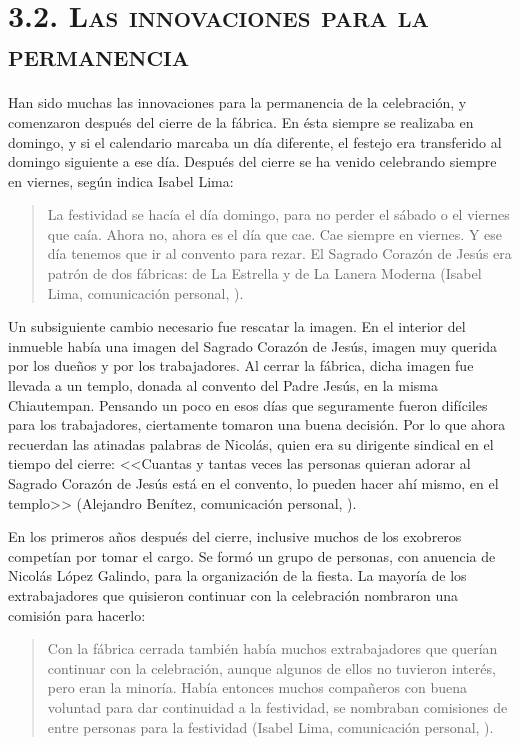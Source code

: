 \documentclass[14pt,letterpaper,twoside]{extbook} %
\begin{document}
\section*{\mdseries\large\textsc{3.2. Las innovaciones para la permanencia}}

\noindent Han sido muchas las innovaciones para la permanencia de la celebración, y comenzaron después del cierre de la fábrica. En ésta siempre se realizaba en domingo, y si el calendario marcaba un día diferente, el festejo era transferido al domingo siguiente a ese día. Después del cierre se ha venido celebrando siempre en viernes, según indica Isabel Lima:

\begin{quotation}
\noindent La festividad se hacía el día domingo, para no perder el sábado o el viernes que caía. Ahora no, ahora es el día que cae. Cae siempre en viernes. Y ese día tenemos que ir al convento para rezar. El Sagrado Corazón de Jesús era patrón de dos fábricas: de La Estrella y de La Lanera Moderna (Isabel Lima, comunicación personal, ).
\end{quotation}

\noindent Un subsiguiente cambio necesario fue rescatar la imagen. En el interior del inmueble había una imagen del Sagrado Corazón de Jesús, imagen muy querida por los dueños y por los trabajadores. Al cerrar la fábrica, dicha imagen fue llevada a un templo, donada al convento del Padre Jesús, en la misma Chiautempan. Pensando un poco en esos días que seguramente fueron difíciles para los trabajadores, ciertamente tomaron una buena decisión. Por lo que ahora recuerdan las atinadas palabras de Nicolás, quien era su dirigente sindical en el tiempo del cierre: <<Cuantas y tantas veces las personas quieran adorar al Sagrado Corazón de Jesús está en el convento, lo pueden hacer ahí mismo, en el templo>> (Alejandro Benítez, comunicación personal, ).

En los primeros años después del cierre, inclusive muchos de los exobreros competían por tomar el cargo. Se formó un grupo de personas, con anuencia de Nicolás López Galindo, para la organización de la fiesta. La mayoría de los extrabajadores que quisieron continuar con la celebración nombraron una comisión para hacerlo:

\begin{quotation}
\noindent Con la fábrica cerrada también había muchos extrabajadores que querían continuar con la celebración, aunque algunos de ellos no tuvieron interés, pero eran la minoría. Había entonces muchos compañeros con buena voluntad para dar continuidad a la festividad, se nombraban comisiones de entre  personas para la festividad (Isabel Lima, comunicación personal, ).
\end{quotation}
\end{document}
